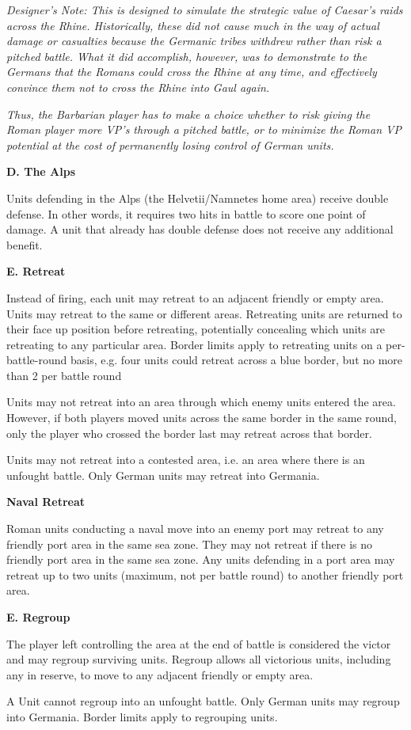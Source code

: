 \textit{Designer's Note: This is designed to simulate the strategic value of Caesar's raids across the Rhine. Historically, these did not cause much in the way of actual damage or casualties because the Germanic tribes withdrew rather than risk a pitched battle. What it did accomplish, however, was to demonstrate to the Germans that the Romans could cross the Rhine at any time, and effectively convince them not to cross the Rhine into Gaul again.}
\par
\textit{Thus, the Barbarian player has to make a choice whether to risk giving the Roman player more VP's through a pitched battle, or to minimize the Roman VP potential at the cost of permanently losing control of German units.}

\textbf{D. The Alps}
\par
Units defending in the Alps (the Helvetii/Namnetes home area) receive double defense. In other words, it requires two hits in battle to score one point of damage. A unit that already has double defense does not receive any additional benefit.

\textbf{E. Retreat}
\par
Instead of firing, each unit may retreat to an adjacent friendly or empty area. Units may retreat to the same or different areas. Retreating units are returned to their face up position before retreating, potentially concealing which units are retreating to any particular area. Border limits apply to retreating units on a per-battle-round basis, e.g. four units could retreat across a blue border, but no more than 2 per battle round

Units may not retreat into an area through which enemy units entered the area. However, if both players moved units across the same border in the same round, only the player who crossed the border last may retreat across that border.

Units may not retreat into a contested area, i.e. an area where there is an unfought battle. Only German units may retreat into Germania.

\textbf{Naval Retreat}
\par
Roman units conducting a naval move into an enemy port may retreat to any friendly port area in the same sea zone. They may not retreat if there is no friendly port area in the same sea zone. Any units defending in a port area may retreat up to two units (maximum, not per battle round) to another friendly port area.

\textbf{E. Regroup}
\par
The player left controlling the area at the end of battle is considered the victor and may regroup surviving units. Regroup allows all victorious units, including any in reserve, to move to any adjacent friendly or empty area.

A Unit cannot regroup into an unfought battle. Only German units may regroup into Germania. Border limits apply to regrouping units.
